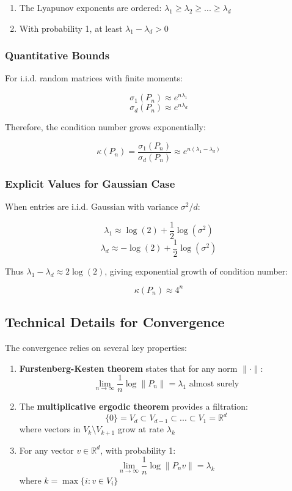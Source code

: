 \documentclass[12pt]{article}
\theoremstyle{plain}
\theoremstyle{definition}
\theoremstyle{remark}
\begin{document}
\begin{enumerate}
    \item The Lyapunov exponents are ordered: $\lambda_1 \geq \lambda_2 \geq ... \geq \lambda_d$
    \item With probability 1, at least $\lambda_1 - \lambda_d > 0$
\end{enumerate}

\subsubsection{Quantitative Bounds}
For i.i.d. random matrices with finite moments:

\[
\sigma_1(P_n) \approx e^{n\lambda_1}
\]
\[
\sigma_d(P_n) \approx e^{n\lambda_d}
\]

Therefore, the condition number grows exponentially:

\[
\kappa(P_n) = \frac{\sigma_1(P_n)}{\sigma_d(P_n)} \approx e^{n(\lambda_1 - \lambda_d)}
\]

\subsubsection{Explicit Values for Gaussian Case}
When entries are i.i.d. Gaussian with variance $\sigma^2/d$:

\[
\lambda_1 \approx \log(2) + \frac{1}{2}\log(\sigma^2)
\]
\[
\lambda_d \approx -\log(2) + \frac{1}{2}\log(\sigma^2)
\]

Thus $\lambda_1 - \lambda_d \approx 2\log(2)$, giving exponential growth of condition number:

\[
\kappa(P_n) \approx 4^n
\]

\subsection{Technical Details for Convergence}

The convergence relies on several key properties:

\begin{enumerate}
    \item \textbf{Furstenberg-Kesten theorem} states that for any norm $\|\cdot\|$:
    \[
    \lim_{n \to \infty} \frac{1}{n} \log \|P_n\| = \lambda_1 \text{ almost surely}
    \]

    \item The \textbf{multiplicative ergodic theorem} provides a filtration:
    \[
    \{0\} = V_d \subset V_{d-1} \subset ... \subset V_1 = \mathbb{R}^d
    \]
    where vectors in $V_k \setminus V_{k+1}$ grow at rate $\lambda_k$

    \item For any vector $v \in \mathbb{R}^d$, with probability 1:
    \[
    \lim_{n \to \infty} \frac{1}{n} \log \|P_n v\| = \lambda_k
    \]
    where $k = \max\{i : v \in V_i\}$
\end{enumerate}
\end{document}
